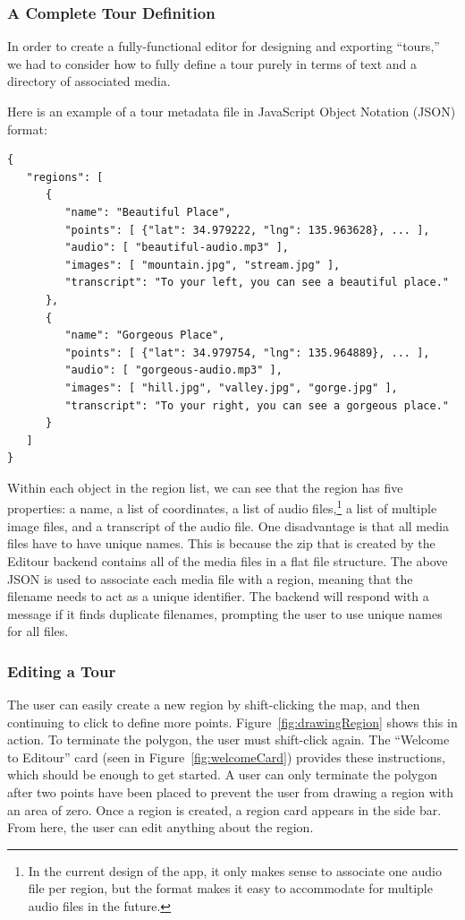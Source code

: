 \documentclass[a4paper, 10pt, american, titlepage]{article}
\begin{document}
\subsubsection{A Complete Tour Definition}
\label{sec:tourDefinition}

In order to create a fully-functional editor for designing and exporting
``tours,'' we had to consider how to fully define a tour purely in terms
of text and a directory of associated media.

Here is an example of a tour metadata file in JavaScript Object Notation (JSON)
format:

\begin{verbatim}
{
   "regions": [
      {
         "name": "Beautiful Place",
         "points": [ {"lat": 34.979222, "lng": 135.963628}, ... ],
         "audio": [ "beautiful-audio.mp3" ],
         "images": [ "mountain.jpg", "stream.jpg" ],
         "transcript": "To your left, you can see a beautiful place."
      },
      {
         "name": "Gorgeous Place",
         "points": [ {"lat": 34.979754, "lng": 135.964889}, ... ],
         "audio": [ "gorgeous-audio.mp3" ],
         "images": [ "hill.jpg", "valley.jpg", "gorge.jpg" ],
         "transcript": "To your right, you can see a gorgeous place."
      }
   ]
}
\end{verbatim}

Within each object in the region list, we can see that the region has five
properties: a name, a list of coordinates, a list of audio files,\footnote{In
the current design of the app, it only makes sense to associate one audio file
per region, but the format makes it easy to accommodate for multiple audio
files in the future.} a list of multiple image files, and a transcript of the
audio file. One disadvantage is that all media files have to have unique names.
This is because the zip that is created by the Editour backend contains all of
the media files in a flat file structure. The above JSON is used to associate
each media file with a region, meaning that the filename needs to act as a
unique identifier. The backend will respond with a message if it finds
duplicate filenames, prompting the user to use unique names for all files.

\subsubsection{Editing a Tour}
\label{sec:editingATour}

The user can easily create a new region by shift-clicking the map, and then
continuing to click to define more points. Figure~\ref{fig:drawingRegion} shows
this in action. To terminate the polygon, the user must shift-click again. The
``Welcome to Editour'' card (seen in Figure~\ref{fig:welcomeCard}) provides
these instructions, which should be enough to get started. A user can only
terminate the polygon after two points have been placed to prevent the user
from drawing a region with an area of zero. Once a region is created, a region
card appears in the side bar. From here, the user can edit anything about the
region.
\end{document}
